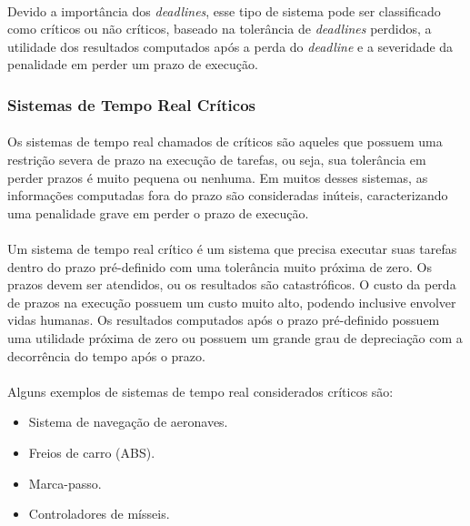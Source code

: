 \paragraph{}
Devido a importância dos \textit{deadlines}, esse tipo de sistema pode ser classificado como
críticos ou não críticos, baseado na tolerância de \textit{deadlines} perdidos, a utilidade
dos resultados computados após a perda do \textit{deadline} e a severidade da penalidade em
perder um prazo de execução.

\subsubsection{Sistemas de Tempo Real Críticos}
\paragraph{}
Os sistemas de tempo real chamados de críticos são aqueles que possuem uma restrição severa
de prazo na execução de tarefas, ou seja, sua tolerância em perder prazos é muito pequena
ou nenhuma. Em muitos desses sistemas, as informações computadas fora do prazo são consideradas
inúteis, caracterizando uma penalidade grave em perder o prazo de execução.
\paragraph{}
Um sistema de tempo real crítico é um sistema que precisa executar suas tarefas dentro do prazo
pré-definido com uma tolerância muito próxima de zero. Os prazos devem ser atendidos, ou os resultados
são catastróficos. O custo da perda de prazos na execução possuem um custo muito alto, podendo inclusive
envolver vidas humanas. Os resultados computados após o prazo pré-definido possuem uma utilidade próxima
de zero ou possuem um grande grau de depreciação com a decorrência do tempo após o prazo.~\cite{Li:2003:RCE:829584}
\paragraph{}
Alguns exemplos de sistemas de tempo real considerados críticos são:
\begin{itemize}
\item Sistema de navegação de aeronaves.
\item Freios de carro (ABS).
\item Marca-passo.
\item Controladores de mísseis.
\end{itemize}

